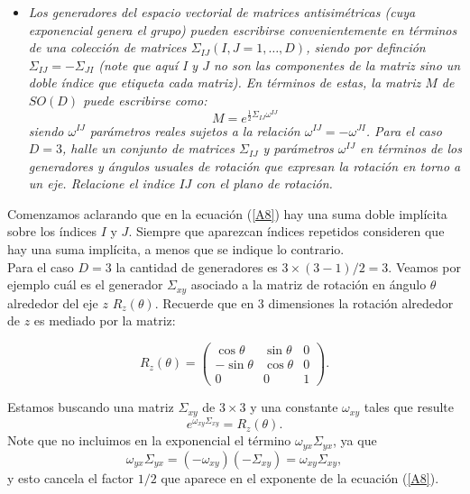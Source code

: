 \begin{itemize}
    \item \emph{Los generadores del espacio vectorial de matrices antisimétricas (cuya exponencial genera el grupo) pueden escribirse convenientemente en términos de una colección de matrices $\Sigma_{I J}(I, J=1, \ldots, D)$, siendo por definción $\Sigma_{I J}=-\Sigma_{J I}$ (note que aquí I y $J$ no son las componentes de la matriz sino un doble índice que etiqueta cada matriz). En términos de estas, la matriz $M$ de $S O(D)$ puede escribirse como:}
    \begin{equation}
        M=e^{\frac{1}{2}\Sigma_{IJ}\omega^{IJ}}
        \label{A8}
    \end{equation}
    \emph{siendo $\omega^{I J}$ parámetros reales sujetos a la relación $\omega^{I J}=-\omega^{J I}$. Para el caso $D=3$, halle un conjunto de matrices $\Sigma_{I J}$ y parámetros $\omega^{I J}$ en términos de los generadores y ángulos usuales de rotación que expresan la rotación en torno a un eje. Relacione el indice $IJ$ con el plano de rotación.}
\end{itemize}
\vspace{0.2cm}
Comenzamos aclarando que en la ecuación (\ref{A8}) hay una suma doble implícita sobre los índices $I$ y $J$. Siempre que aparezcan índices repetidos consideren que hay una suma implícita, a menos que se indique lo contrario.\\

Para el caso $D=3$ la cantidad de generadores es $3 \times(3-1) / 2=3$. Veamos por ejemplo cuál es el generador $\Sigma_{x y}$ asociado a la matriz de rotación en ángulo $\theta$ alrededor del eje $z$ $R_{z}(\theta)$. Recuerde que en 3 dimensiones la rotación alrededor de $z$ es mediado por la matriz:

 \begin{equation}
    R_{z}(\theta)=\left(\begin{array}{ccc}\cos \theta & \sin \theta & 0 \\ -\sin \theta & \cos \theta & 0 \\ 0 & 0 & 1\end{array}\right).
    \label{eqA9}
\end{equation}

Estamos buscando una matriz $\Sigma_{x y}$ de $3 \times 3$ y una constante $\omega_{x y}$ tales que resulte
\begin{equation}
    e^{\omega_{xy}\Sigma_{xy}}=R_{z}(\theta).
\end{equation}
Note que no incluimos en la exponencial el término $\omega_{y x}\Sigma_{y x}$, ya que
\begin{equation*}
\omega_{y x} \Sigma_{y x}=\left(-\omega_{x y}\right)\left(-\Sigma_{x y}\right)= \omega_{x y} \Sigma_{x y},
\end{equation*}
y esto cancela el factor $1/2$ que aparece en el exponente de la ecuación (\ref{A8}).\\
\vspace{0.3cm}

